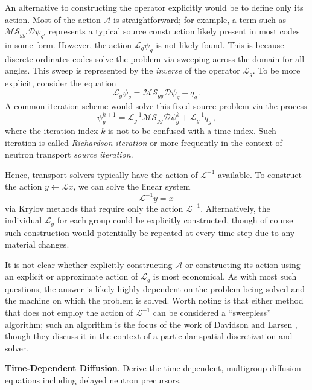 An alternative to constructing the operator explicitly would be to
define only its action.  Most of the action $\mathcal{A}$ is
straightforward; for example, a term such as 
$\mathcal{M} \mathcal{S}_{gg'} \mathcal{D} \psi_{g'}$ represents a typical
source construction likely present in most codes in some form.  However,
the action $\mathcal{L}_g \psi_{g}$ is not likely found.  This is because
discrete ordinates codes solve the problem via sweeping across the domain
for all angles.  This sweep is represented by the \emph{inverse} of the 
operator $\mathcal{L}_g $.  To be more explicit, consider the 
equation
\begin{equation}
 \mathcal{L}_g \psi_g = \mathcal{M} \mathcal{S}_{gg} \mathcal{D} \psi_g + q_g \, .
\end{equation}
A common iteration scheme would solve this fixed source problem via the process
\begin{equation}
 \psi_g^{k+1} = \mathcal{L}^{-1}_g  \mathcal{M}  \mathcal{S}_{gg}  \mathcal{D} \psi^{k}_g + \mathcal{L}^{-1}_g q_g \, ,
\end{equation}
where the iteration index $k$ is not to be confused with a time index.
Such iteration is called \emph{Richardson iteration} or more frequently 
in the context of neutron transport \emph{source iteration}.

Hence, transport solvers typically have the action of $\mathcal{L}^{-1}$
available.  To construct the action $y \gets \mathcal{L} x$, we can solve
the linear system
\begin{equation}
 \mathcal{L}^{-1} y = x \, 
\end{equation}
via Krylov methods that require only the action $\mathcal{L}^{-1}$. 
Alternatively, the individual $\mathcal{L}_g$ for each group could
be explicitly constructed, though of course such construction 
would potentially be repeated at every time step due to any material
changes. 

It is not clear whether explicitly constructing $\mathcal{A}$ or
constructing its action using an explicit or approximate action of
$\mathcal{L}_g$ is most economical.  As with most such questions,
the answer is likely highly dependent on the problem being solved and
the machine on which the problem is solved.  Worth noting is that
either method that does not employ the action of $\mathcal{L}^{-1}$ can
be considered a ``sweepless'' algorithm; such an algorithm is
the focus of the work of Davidson and Larsen \cite{davidson2009std},
though they discuss it in the context of a particular spatial 
discretization and solver.


\begin{exercises}

  \item \textbf{Time-Dependent Diffusion}. 
    Derive the time-dependent, multigroup diffusion equations including 
    delayed neutron precursors.
  
\end{exercises}